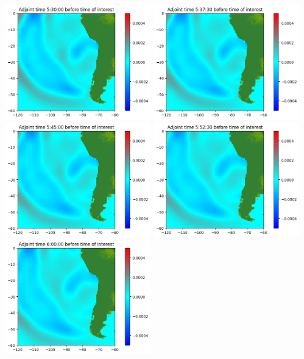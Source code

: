 \documentclass[11pt]{article}
\begin{document}
\vskip 10pt 
\includegraphics[width=0.475\textwidth]{frame0044fig0.png}
\vskip 10pt 
\includegraphics[width=0.475\textwidth]{frame0045fig0.png}
\vskip 10pt 
\includegraphics[width=0.475\textwidth]{frame0046fig0.png}
\vskip 10pt 
\includegraphics[width=0.475\textwidth]{frame0047fig0.png}
\vskip 10pt 
\includegraphics[width=0.475\textwidth]{frame0048fig0.png}
\end{document}
